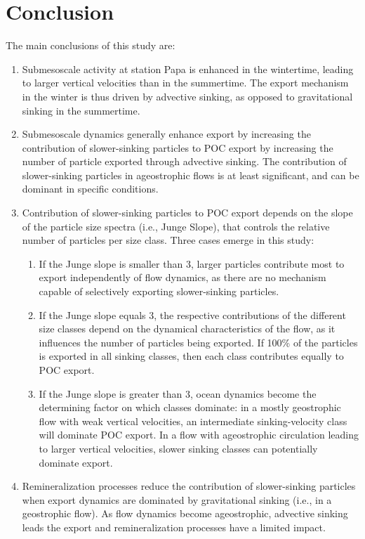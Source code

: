 \documentclass[draft,linenumbers]{agujournal2018}
\begin{document}
\section{Conclusion}
\label{sec: Conclusions}
The main conclusions of this study are: 
\begin{enumerate}
\item Submesoscale activity at station Papa is enhanced in the wintertime, leading to larger vertical velocities than in the summertime. The export mechanism in the winter is thus driven by advective sinking, as opposed to gravitational sinking in the summertime.
\item Submesoscale dynamics generally enhance export by increasing the contribution of slower-sinking particles to POC export by increasing the number of particle exported through advective sinking. The contribution of slower-sinking particles in ageostrophic flows is at least significant, and can be dominant in specific conditions.
\item Contribution of slower-sinking particles to POC export depends on the slope of the particle size spectra (i.e., Junge Slope), that controls the relative number of particles per size class. Three cases emerge in this study:
\begin{enumerate}
	\item If the Junge slope is smaller than 3, larger particles contribute most to export independently of flow dynamics, as there are no mechanism capable of selectively exporting slower-sinking particles.
	\item If the Junge slope equals 3, the respective contributions of the different size classes depend on the dynamical characteristics of the flow, as it influences the number of particles being exported. If 100\% of the particles is exported in all sinking classes, then each class contributes equally to POC export.
	\item If the Junge slope is greater than 3, ocean dynamics become the determining factor on which classes dominate: in a mostly geostrophic flow with weak vertical velocities, an intermediate sinking-velocity class will dominate POC export. In a flow with ageostrophic circulation leading to larger vertical velocities, slower sinking classes can potentially dominate export.
	\end{enumerate}
\item Remineralization processes reduce the contribution of slower-sinking particles when export dynamics are dominated by gravitational sinking (i.e., in a geostrophic flow). As flow dynamics become ageostrophic, advective sinking leads the export and remineralization processes have a limited impact.
\end{enumerate}
\end{document}
